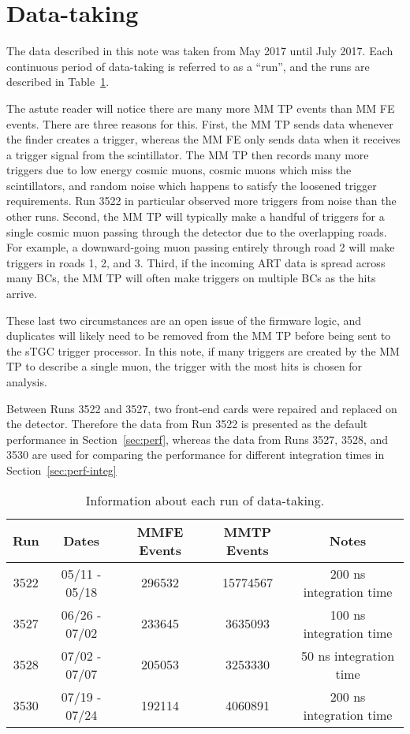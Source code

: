\section{Data-taking}
\label{sec:data-taking}

The data described in this note was taken from May 2017 until July 2017. Each continuous period of data-taking is referred to as a ``run'', and the runs are described in Table~\ref{tab:runs}. 

The astute reader will notice there are many more MM TP events than MM FE events. There are three reasons for this. First, the MM TP sends data whenever the finder creates a trigger, whereas the MM FE only sends data when it receives a trigger signal from the scintillator. The MM TP then records many more triggers due to low energy cosmic muons, cosmic muons which miss the scintillators, and random noise which happens to satisfy the loosened trigger requirements. Run 3522 in particular observed more triggers from noise than the other runs. Second, the MM TP will typically make a handful of triggers for a single cosmic muon passing through the detector due to the overlapping roads. For example, a downward-going muon passing entirely through road 2 will make triggers in roads 1, 2, and 3. Third, if the incoming ART data is spread across many BCs, the MM TP will often make triggers on multiple BCs as the hits arrive. 

These last two circumstances are an open issue of the firmware logic, and duplicates will likely need to be removed from the MM TP before being sent to the sTGC trigger processor. In this note, if many triggers are created by the MM TP to describe a single muon, the trigger with the most hits is chosen for analysis.

Between Runs 3522 and 3527, two front-end cards were repaired and replaced on the detector. Therefore the data from Run 3522 is presented as the default performance in Section~\ref{sec:perf}, whereas the data from Runs 3527, 3528, and 3530 are used for comparing the performance for different integration times in Section~\ref{sec:perf-integ}

\begin{table}[!htpb]
\begin{center}
  \begin{tabular}{c | c | c | c | c}
    Run  & Dates         & MMFE Events & MMTP Events & Notes \\
    \hline
    3522 & 05/11 - 05/18 & 296532      & 15774567    & 200 ns integration time \\
    3527 & 06/26 - 07/02 & 233645      & 3635093     & 100 ns integration time \\
    3528 & 07/02 - 07/07 & 205053      & 3253330     & 50 ns integration time \\
    3530 & 07/19 - 07/24 & 192114      & 4060891     & 200 ns integration time \\
  \end{tabular}
  \caption{Information about each run of data-taking.}
\label{tab:runs}
\end{center}
\end{table}

